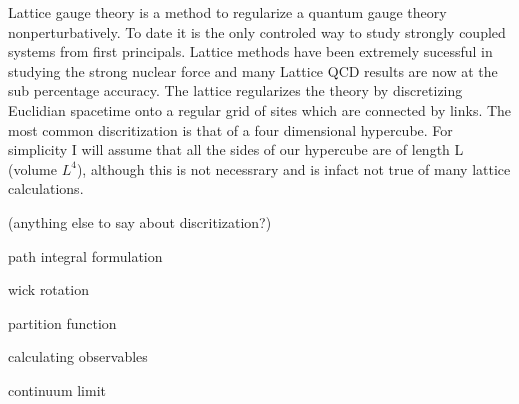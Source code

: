 
Lattice gauge theory is a method to regularize a quantum gauge theory nonperturbatively.
To date it is the only controled way to study strongly coupled systems from first principals.
Lattice methods have been extremely sucessful in studying the strong nuclear force and many Lattice QCD results are now at the sub percentage accuracy.
The lattice regularizes the theory by discretizing Euclidian spacetime onto a regular grid of sites which are connected by links.
The most common discritization is that of a four dimensional hypercube.
For simplicity I will assume that all the sides of our hypercube are of length L (volume $L^4$), although this is not necessrary and is infact not true of many lattice calculations.

(anything else to say about discritization?)

path integral formulation

wick rotation

partition function

calculating observables

continuum limit


